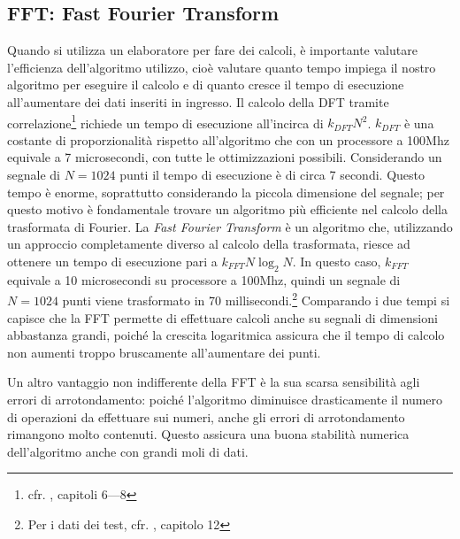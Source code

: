 \subsection{FFT: Fast Fourier Transform}
\label{fft}
Quando si utilizza un elaboratore per fare dei calcoli, \`e importante valutare
l'efficienza dell'algoritmo utilizzo, cio\`e valutare quanto tempo impiega il
nostro algoritmo per eseguire il calcolo e di quanto cresce il tempo di
esecuzione all'aumentare dei dati inseriti in ingresso. Il calcolo della DFT
tramite correlazione\footnote{cfr. \cite{TSEGDSP97}, capitoli 6---8} richiede un
tempo di esecuzione all'incirca di $k_{DFT}N^2$. $k_{DFT}$  \`e una costante di
proporzionalit\`a rispetto all'algoritmo che con un processore a 100Mhz
equivale a 7 microsecondi, con tutte le ottimizzazioni possibili. Considerando un segnale
di $N = 1024$ punti il tempo di esecuzione \`e di circa 7 secondi. Questo tempo
\`e enorme, soprattutto considerando la piccola dimensione del segnale; per
questo motivo \`e fondamentale trovare un algoritmo pi\`u efficiente nel calcolo
della trasformata di Fourier. La \emph{Fast Fourier Transform} \`e un algoritmo
che, utilizzando un approccio completamente diverso al calcolo della
trasformata, riesce ad ottenere un tempo di esecuzione pari a
$k_{FFT}N\log_{2}N$. In questo caso, $k_{FFT}$ equivale a 10 microsecondi su
processore a 100Mhz, quindi un segnale di $N=1024$ punti viene trasformato in 70
millisecondi.\footnote{Per i dati dei test, cfr. \cite{TSEGDSP97}, capitolo 12}
Comparando i due tempi si capisce che la FFT permette di effettuare calcoli
anche su segnali di dimensioni abbastanza grandi, poich\'e la crescita
logaritmica assicura che il tempo di calcolo non aumenti troppo bruscamente
all'aumentare dei punti.

Un altro vantaggio non indifferente della \ac{FFT} \`e la sua scarsa sensibilit\`a
agli errori di arrotondamento: poich\'e l'algoritmo diminuisce drasticamente il
numero di operazioni da effettuare sui numeri, anche gli errori di
arrotondamento rimangono molto contenuti. Questo assicura una buona stabilit\`a
numerica dell'algoritmo anche con grandi moli di dati.
